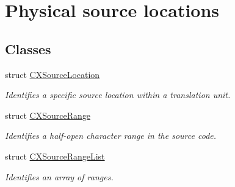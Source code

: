\hypertarget{group__CINDEX__LOCATIONS}{}\section{Physical source locations}
\label{group__CINDEX__LOCATIONS}
\subsection*{Classes}
\begin{DoxyCompactItemize}
\item 
struct \mbox{\hyperlink{structCXSourceLocation}{C\+X\+Source\+Location}}
\begin{DoxyCompactList}\small\item\em Identifies a specific source location within a translation unit. \end{DoxyCompactList}\item 
struct \mbox{\hyperlink{structCXSourceRange}{C\+X\+Source\+Range}}
\begin{DoxyCompactList}\small\item\em Identifies a half-\/open character range in the source code. \end{DoxyCompactList}\item 
struct \mbox{\hyperlink{structCXSourceRangeList}{C\+X\+Source\+Range\+List}}
\begin{DoxyCompactList}\small\item\em Identifies an array of ranges. \end{DoxyCompactList}\end{DoxyCompactItemize}
